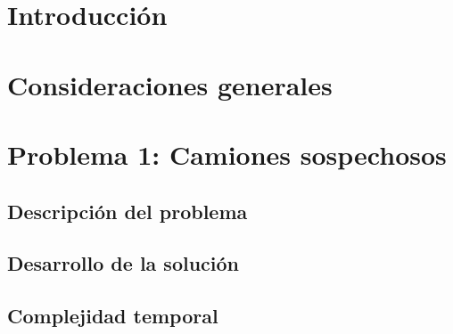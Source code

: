 \documentclass[a4paper, 10pt, twoside]{article}
\begin{document}
\newpage



\tableofcontents

\newpage



\section{Introducción}


\section{Consideraciones generales}


\newpage



\section{Problema 1: Camiones sospechosos}

\subsection{Descripción del problema}
\label{problema1-descripcion}


\subsection{Desarrollo de la solución}
\label{problema1-desarrollo}


\subsection{Complejidad temporal}
\label{problema1-complejidad}

\end{document}
